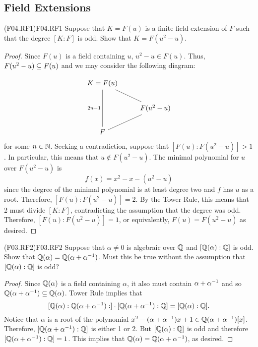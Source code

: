 \documentclass[../AlgebraQualSolutions.tex]{subfiles}
\begin{document}
\subsection{Field Extensions}

\begin{prob}{(F04.RF1)}{F04.RF1}
	Suppose that $K = F(u)$ is a finite field extension of $F$ such that the degree $[K:F]$ is odd. Show that $K = F(u^2 - u)$.
\end{prob}

\begin{proof}
	Since $F(u)$ is a field containing $u$, $u^2 - u \in F(u)$. Thus, $F(u^2 - u) \subseteq F(u)$ and we may consider the following diagram:

	\[\begin{tikzcd}
		K = F(u) \ar[dd, no head,"2n - 1"'] \ar[dr, no head] & \\
		 & F(u^2 - u) \ar[dl, no head] \\
		 F &
	\end{tikzcd}\]
	for some $n \in \mathbb{N}$. Seeking a contradiction, suppose that $[F(u): F(u^2 - u)] > 1$. In particular, this means that $u \not\in F(u^2 - u)$. The minimal polynomial for $u$ over $F(u^2 - u)$ is 
		\[f(x) = x^2 - x - (u^2 - u)\]
	since the degree of the minimal polynomial is at least degree two and $f$ has $u$ as a root. Therefore, $[F(u): F(u^2 - u)] = 2$. By the Tower Rule, this means that 2 must divide $[K: F]$, contradicting the assumption that the degree was odd. Therefore, $[F(u): F(u^2 - u)] = 1$, or equivalently, $F(u) =  F(u^2 - u)$ as desired.
\end{proof}


\begin{prob}{(F03.RF2)}{F03.RF2}
	Suppose that $\alpha \neq 0$ is algebraic over $\mathbb{Q}$ and $[\mathbb{Q}(\alpha): \mathbb{Q}]$ is odd. Show that $\mathbb{Q}(\alpha) = \mathbb{Q}(\alpha + \alpha^{-1})$. Must this be true without the assumption that $[\mathbb{Q}(\alpha): \mathbb{Q}]$ is odd?
\end{prob}

\begin{proof}
	Since $\mathbb{Q}(\alpha)$ is a field containing $\alpha$, it also must contain $\alpha + \alpha^{-1}$ and so $\mathbb{Q}(\alpha + \alpha^{-1}) \subseteq \mathbb{Q}(\alpha)$. Tower Rule implies that
		\[[\mathbb{Q}(\alpha): \mathbb{Q}(\alpha + \alpha^{-1}):] \cdot [\mathbb{Q}(\alpha + \alpha^{-1}): \mathbb{Q}] = [\mathbb{Q}(\alpha): \mathbb{Q}].\]
	Notice that $\alpha$ is a root of the polynomial $x^2 - (\alpha + \alpha^{-1})x + 1 \in \mathbb{Q}(\alpha + \alpha^{-1})[x]$. Therefore, $[\mathbb{Q}(\alpha + \alpha^{-1}): \mathbb{Q}]$ is either 1 or 2. But $[\mathbb{Q}(\alpha): \mathbb{Q}]$ is odd and therefore $[\mathbb{Q}(\alpha + \alpha^{-1}): \mathbb{Q}] = 1$. This implies that $\mathbb{Q}(\alpha) = \mathbb{Q}(\alpha + \alpha^{-1})$, as desired.
\end{proof}
\end{document}
